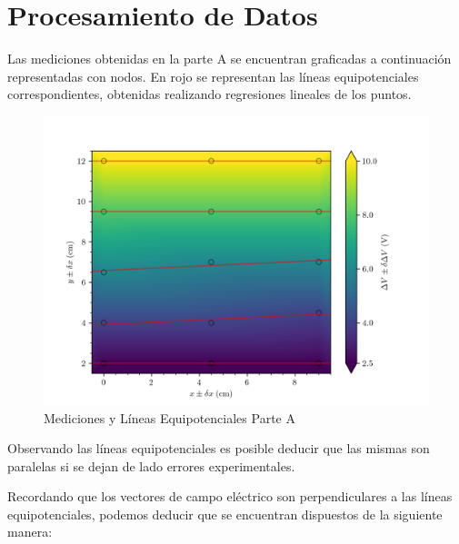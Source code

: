 \documentclass{article}
\begin{document}
\section{Procesamiento de Datos}

Las mediciones obtenidas en la parte A se encuentran graficadas a continuación representadas con nodos. En rojo se representan las líneas equipotenciales correspondientes, obtenidas realizando regresiones lineales de los puntos. 

\begin{figure}[H]
  \hspace{-0.1cm}\includegraphics[scale=0.8]{plot1.png}
  \caption{Mediciones y Líneas Equipotenciales Parte A}
\end{figure}

Observando las líneas equipotenciales es posible deducir que las mismas son paralelas si se dejan de lado errores experimentales.

Recordando que los vectores de campo eléctrico son perpendiculares a las líneas equipotenciales, podemos deducir que se encuentran dispuestos de la siguiente manera:

\phantom{x}
\end{document}
